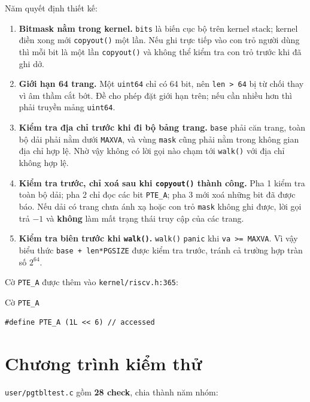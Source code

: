 Năm quyết định thiết kế:

\begin{enumerate}[itemsep=2.5pt, topsep=2.5pt, leftmargin=1.5cm]
    \item \textbf{Bitmask nằm trong kernel.} \texttt{bits} là biến cục bộ trên kernel stack; kernel điền xong mới \texttt{copyout()} một lần. Nếu ghi trực tiếp vào con trỏ người dùng thì mỗi bit là một lần \texttt{copyout()} và không thể kiểm tra con trỏ trước khi đã ghi dở.
    \item \textbf{Giới hạn 64 trang.} Một \texttt{uint64} chỉ có 64 bit, nên \texttt{len > 64} bị từ chối thay vì âm thầm cắt bớt. Đề cho phép đặt giới hạn trên; nếu cần nhiều hơn thì phải truyền mảng \texttt{uint64}.
    \item \textbf{Kiểm tra địa chỉ trước khi đi bộ bảng trang.} \texttt{base} phải căn trang, toàn bộ dải phải nằm dưới \texttt{MAXVA}, và vùng \texttt{mask} cũng phải nằm trong không gian địa chỉ hợp lệ. Nhờ vậy không có lời gọi nào chạm tới \texttt{walk()} với địa chỉ không hợp lệ.
    \item \textbf{Kiểm tra trước, chỉ xoá sau khi \texttt{copyout()} thành công.} Pha 1 kiểm tra toàn bộ dải; pha 2 chỉ đọc các bit \texttt{PTE\_A}; pha 3 mới xoá những bit đã được báo. Nếu dải có trang chưa ánh xạ hoặc con trỏ \texttt{mask} không ghi được, lời gọi trả $-1$ và \textbf{không} làm mất trạng thái truy cập của các trang.
    \item \textbf{Kiểm tra biên trước khi \texttt{walk()}.} \texttt{walk()} \texttt{panic} khi \texttt{va >= MAXVA}. Vì vậy biểu thức \texttt{base + len*PGSIZE} được kiểm tra trước, tránh cả trường hợp tràn số $2^{64}$.
\end{enumerate}

Cờ \texttt{PTE\_A} được thêm vào \texttt{kernel/riscv.h:365}:

\begin{codebox}[pteA]{Cờ \texttt{PTE\_A}}
    \begin{verbatim}
#define PTE_A (1L << 6) // accessed
    \end{verbatim}
\end{codebox}

\section{Chương trình kiểm thử}

\texttt{user/pgtbltest.c} gồm \textbf{28 check}, chia thành năm nhóm:

